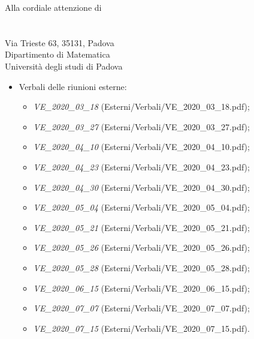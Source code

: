 \documentclass[a4paper]{letter}
\begin{document}
\begin{letter} {Alla cordiale attenzione di \\ \TV \\ \RC \\ Via Trieste 63, 35131, Padova\\ Dipartimento di Matematica \\ Università degli studi di Padova }
\begin{itemize}
\begin{itemize}
				\item \textit{VI\_2020\_06\_20} (Interni/Verbali/VI\_2020\_06\_20.pdf);
				\item \textit{VI\_2020\_06\_22} (Interni/Verbali/VI\_2020\_06\_22.pdf);
				\item \textit{VI\_2020\_06\_26} (Interni/Verbali/VI\_2020\_06\_26.pdf);
				\item \textit{VI\_2020\_07\_02} (Interni/Verbali/VI\_2020\_07\_02.pdf);
				\item \textit{VI\_2020\_07\_06} (Interni/Verbali/VI\_2020\_07\_06.pdf);
				\item \textit{VI\_2020\_07\_13} (Interni/Verbali/VI\_2020\_07\_13.pdf);
				\item \textit{VI\_2020\_07\_15} (Interni/Verbali/VI\_2020\_07\_15.pdf).
      \end{itemize}
    \item Verbali delle riunioni esterne:
      \begin{itemize}
      				\item \textit{VE\_2020\_03\_18} (Esterni/Verbali/VE\_2020\_03\_18.pdf);
				\item \textit{VE\_2020\_03\_27} (Esterni/Verbali/VE\_2020\_03\_27.pdf);
				\item \textit{VE\_2020\_04\_10} (Esterni/Verbali/VE\_2020\_04\_10.pdf);
				\item \textit{VE\_2020\_04\_23} (Esterni/Verbali/VE\_2020\_04\_23.pdf);
				\item \textit{VE\_2020\_04\_30} (Esterni/Verbali/VE\_2020\_04\_30.pdf);
				\item \textit{VE\_2020\_05\_04} (Esterni/Verbali/VE\_2020\_05\_04.pdf);
				\item \textit{VE\_2020\_05\_21} (Esterni/Verbali/VE\_2020\_05\_21.pdf);
				\item \textit{VE\_2020\_05\_26} (Esterni/Verbali/VE\_2020\_05\_26.pdf);
				\item \textit{VE\_2020\_05\_28} (Esterni/Verbali/VE\_2020\_05\_28.pdf);
				\item \textit{VE\_2020\_06\_15} (Esterni/Verbali/VE\_2020\_06\_15.pdf);
				\item \textit{VE\_2020\_07\_07} (Esterni/Verbali/VE\_2020\_07\_07.pdf);
				\item \textit{VE\_2020\_07\_15} (Esterni/Verbali/VE\_2020\_07\_15.pdf).
      \end{itemize}
  \end{itemize}


\end{letter}
\end{document}
